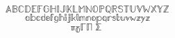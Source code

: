 \documentclass{minimal}
\begin{document}
\[\mathbb{ABCDEFGHIJKLMNOPQRSTUVWXYZ}\]
\[\mathbb{abcdefghijklmnopqrstuvwzyz}\]
\[\mathbb{\pi \gamma \Gamma \Pi \sum}\]
\end{document}
